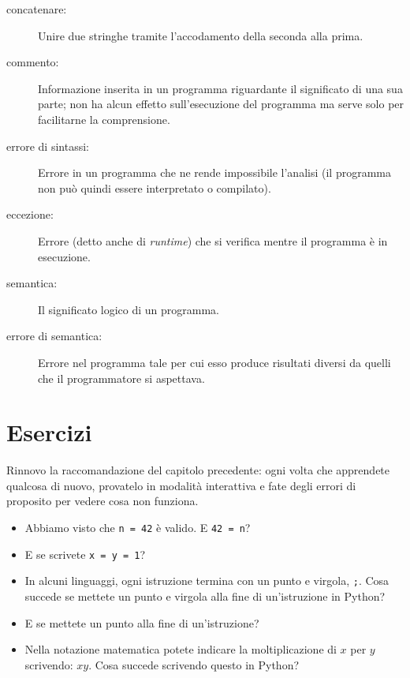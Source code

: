 \documentclass[10pt]{book}
\begin{document}
\begin{description}
\item[concatenare:]  Unire due stringhe tramite l'accodamento della seconda alla prima.

\item[commento:]  Informazione inserita in un programma riguardante il significato di una sua parte; non ha alcun effetto sull'esecuzione del programma
ma serve solo per facilitarne la comprensione.

\item[errore di sintassi:]  Errore in un programma che ne rende impossibile l'analisi (il programma non può quindi essere interpretato o compilato).

\item[eccezione:]  Errore (detto anche di {\em runtime}) che si verifica mentre il programma è in esecuzione.

\item[semantica:]  Il significato logico di un programma.

\item[errore di semantica:]   Errore nel programma tale per cui esso produce risultati diversi da quelli che il programmatore si aspettava.

\end{description}


\section{Esercizi}

\begin{exercise}

Rinnovo la raccomandazione del capitolo precedente: ogni volta che apprendete qualcosa di nuovo, provatelo in modalità interattiva e fate degli errori di proposito per vedere cosa non funziona.

\begin{itemize}

\item Abbiamo visto che {\tt n = 42} è valido. E {\tt 42 = n}?

\item E se scrivete {\tt x = y = 1}?

\item In alcuni linguaggi, ogni istruzione termina con un punto e virgola, {\tt ;}.
Cosa succede se mettete un punto e virgola alla fine di un'istruzione in Python?

\item E se mettete un punto alla fine di un'istruzione?

\item Nella notazione matematica potete indicare la moltiplicazione di $x$ per $y$ scrivendo: $x y$. 
Cosa succede scrivendo questo in Python?

\end{itemize}

\end{exercise}
\end{document}
